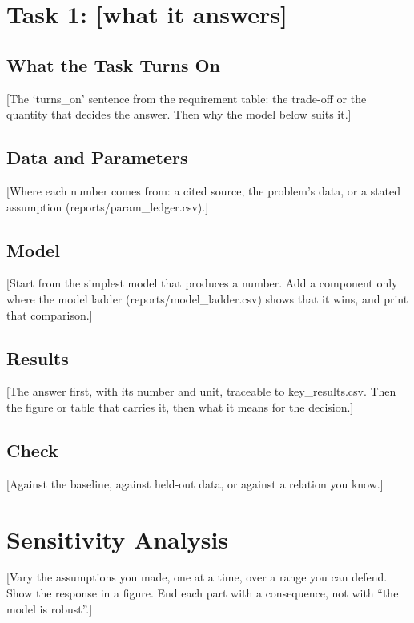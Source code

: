\documentclass[12pt]{article}
\begin{document}
\section{Task 1: [what it answers]}
\subsection{What the Task Turns On}
[The `turns\_on' sentence from the requirement table: the trade-off or the quantity that
decides the answer. Then why the model below suits it.]

\subsection{Data and Parameters}
[Where each number comes from: a cited source, the problem's data, or a stated
assumption (reports/param\_ledger.csv).]

\subsection{Model}
[Start from the simplest model that produces a number. Add a component only where the
model ladder (reports/model\_ladder.csv) shows that it wins, and print that comparison.]

\subsection{Results}
[The answer first, with its number and unit, traceable to key\_results.csv. Then the
figure or table that carries it, then what it means for the decision.]

\subsection{Check}
[Against the baseline, against held-out data, or against a relation you know.]

\section{Sensitivity Analysis}
[Vary the assumptions you made, one at a time, over a range you can defend. Show the
response in a figure. End each part with a consequence, not with ``the model is robust''.]
\end{document}
